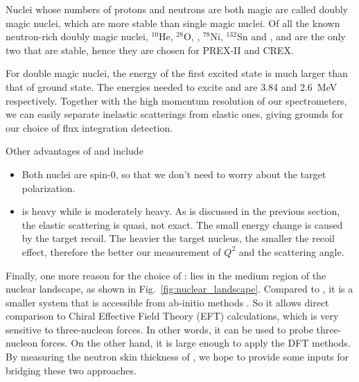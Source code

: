 Nuclei whose numbers of protons and neutrons are both magic are called doubly
magic nuclei, which are more stable than single magic nuclei. Of all the known
neutron-rich doubly magic nuclei, ${}^{10}$He, ${}^{28}$O, \Ca, ${}^{78}$Ni, 
${}^{132}$Sn and \Pb, \Ca and \Pb are the only two that are stable, hence they
are chosen for PREX-II and CREX.

For double magic nuclei, the energy of the first excited state is much larger 
than that of ground state. The energies needed to excite \Ca and \Pb are 
3.84 and 2.6~MeV respectively. 
Together with the high momentum resolution of our spectrometers, we can easily
separate inelastic scatterings from elastic ones, giving grounds for our choice of
flux integration detection.

Other advantages of \Ca and \Pb include
\begin{itemize}
    \item Both nuclei are spin-0, so that we don't need to worry about the target polarization.
    \item \Pb is heavy while \Ca is moderately heavy. As is discussed in the previous section, 
	the elastic scattering is quasi, not exact. The small energy change is 
	caused by the target recoil. The heavier the target nucleus, the smaller the 
	recoil effect, therefore the better our measurement of $Q^2$ and the 
	scattering angle.
\end{itemize}

Finally, one more reason for the choice of \Ca: \Ca lies in the medium region of the nuclear 
landscape, as shown in Fig.~\ref{fig:nuclear_landscape}. Compared to \Pb, it
is a smaller system that is accessible from ab-initio methods \cite{Hagen2016}.
So it allows direct comparison to Chiral Effective Field Theory (EFT) calculations,
which is very sensitive to three-nucleon forces. In other words, it can be used
to probe three-nucleon forces. On the other hand, it is large enough to apply the
DFT methods. By measuring the neutron skin thickness of \Ca, 
we hope to provide some inputs for bridging these two approaches. 

